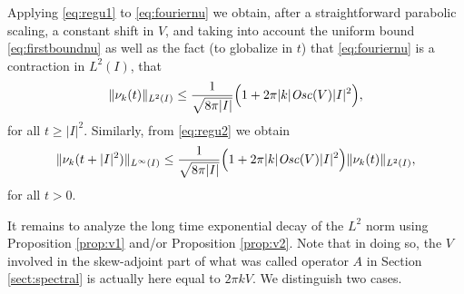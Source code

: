 \documentclass[12pt]{article}
\begin{document}
Applying \eqref{eq:regu1} to \eqref{eq:fouriernu}
we obtain, after a straightforward parabolic scaling, a constant shift in $V$, and taking into account
the uniform bound \eqref{eq:firstboundnu} as well as the fact (to globalize in
$t$) that \eqref{eq:fouriernu} is a contraction in $L^2(I)$, that 
\begin{equation}\label{eq:regunuk1}
\|\nu_k(t)\|_{L^2(I)} \leq \frac{1}{\sqrt{8\pi|I| }}\Big(1 +
2\pi|k|{\it Osc}(V)|I|^2\Big),
\end{equation}
for all $t \geq |I|^2.$ Similarly, from \eqref{eq:regu2} we obtain 
\begin{equation}\label{eq:regunuk2}
\|\nu_k(t + |I|^2)\|_{L^\infty(I)} \leq \frac{1}{\sqrt{8\pi|I| }}\Big(1 +
2\pi|k|{\it Osc}(V)|I|^2\Big)\|\nu_k(t)\|_{L^2(I)},
\end{equation}
for all $t > 0.$

It remains to analyze the long time exponential decay of the $L^2$ norm using
Proposition \ref{prop:v1} and/or Proposition \ref{prop:v2}. Note that in doing
so, the $V$ involved in the skew-adjoint part of what was called operator 
$A$ in Section \ref{sect:spectral} is actually here equal to $2\pi k V$. We
distinguish two cases.
\end{document}
